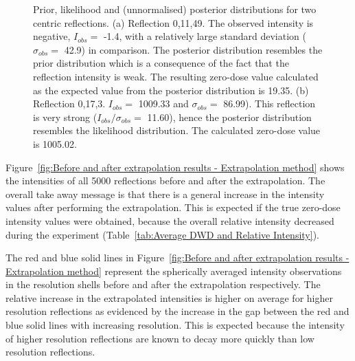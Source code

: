 \begin{figure}
        \caption[Prior, likelihood and (unnormalised) posterior distributions for two centric reflections.]{Prior, likelihood and (unnormalised) posterior distributions for two centric reflections.
		(a) Reflection 0,11,49. The observed intensity is negative, $I_{obs} =$ -1.4, with a relatively large standard deviation ($\sigma_{obs} =$ 42.9) in comparison.
		The posterior distribution resembles the prior distribution which is a consequence of the fact that the reflection intensity is weak.
		The resulting zero-dose value calculated as the expected value from the posterior distribution is 19.35.
		(b) Reflection 0,17,3. $I_{obs} =$ 1009.33 and $\sigma_{obs} =$ 86.99).
		This reflection is very strong ($I_{obs}/\sigma_{obs}  =$ 11.60), hence the posterior distribution resembles the likelihood distribution.
		The calculated zero-dose value is 1005.02.}
        \label{fig:Probabilistic distributions - Extrapolation method}
\end{figure}

Figure~\ref{fig:Before and after extrapolation results - Extrapolation method}  shows the intensities of all 5000 reflections before and after the extrapolation.
The overall take away message is that there is a general increase in the intensity values after performing the extrapolation.
This is expected if the true zero-dose intensity values were obtained, because the overall relative intensity decreased during the experiment (Table~\ref{tab:Average DWD and Relative Intensity}).

The red and blue solid lines in Figure~\ref{fig:Before and after extrapolation results - Extrapolation method} represent the spherically averaged intensity observations in the resolution shells before and after the extrapolation respectively.
The relative increase in the extrapolated intensities is higher on average for higher resolution reflections as evidenced by the increase in the gap between the red and blue solid lines with increasing resolution.
This is expected because the intensity of higher resolution reflections are known to decay more quickly than low resolution reflections.


